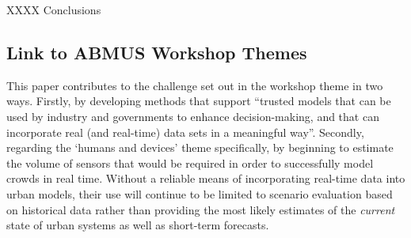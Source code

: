 \documentclass[runningheads]{llncs}
\begin{document}
XXXX Conclusions

\subsection*{Link to ABMUS Workshop Themes}

This paper contributes to the challenge set out in the workshop theme in two ways. Firstly, by developing methods that support ``trusted models that can be used by industry and governments to enhance decision-making, and that can incorporate real (and real-time) data sets in a meaningful way''. Secondly, regarding the `humans and devices' theme specifically, by beginning to estimate the volume of sensors that would be required in order to successfully model crowds in real time. Without a reliable means of incorporating real-time data into urban models, their use will continue to be limited to scenario evaluation based on historical data rather than providing the most likely estimates of the \textit{current} state of urban systems as well as short-term forecasts.




\end{document}
